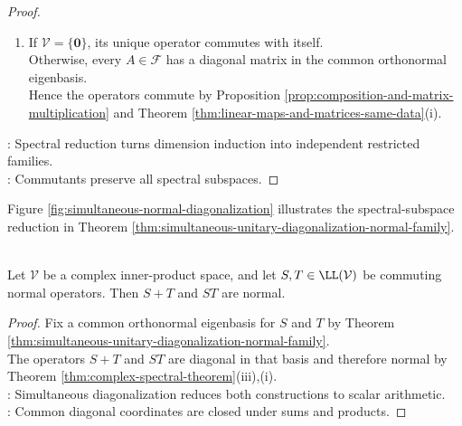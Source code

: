 \begin{theorem}
\begin{proof}
\begin{enumerate}[label=\roman*.]
The identity $\mathcal{V}=\bigoplus\limits_{j=1}^{d}{}^{\perp}\operatorname{range}(P_j)$ holds by Theorem \ref{thm:spectral-resolution-normal-operator}(i)--(ii).\\
Concatenating the restricted bases produces a common orthonormal eigenbasis of $\mathcal{V}$.
\item[$(\Leftarrow)$] If $\mathcal{V}=\{\mathbf{0}\}$, its unique operator commutes with itself.\\
Otherwise, every $A\in\mathcal{F}$ has a diagonal matrix in the common orthonormal eigenbasis.\\
Hence the operators commute by Proposition \ref{prop:composition-and-matrix-multiplication} and Theorem \ref{thm:linear-maps-and-matrices-same-data}(i).
\end{enumerate}
: Spectral reduction turns dimension induction into independent restricted families.\\
: Commutants preserve all spectral subspaces.
\end{proof}
\end{theorem}

Figure \ref{fig:simultaneous-normal-diagonalization} illustrates the spectral-subspace reduction in Theorem \ref{thm:simultaneous-unitary-diagonalization-normal-family}.

\begin{illustrationfigure}[H]
  \centering
  
  \caption{The spectral ranges of $A_0=\sum\limits_j\mu_jP_j$ reduce the commuting family for dimension induction.}
  \label{fig:simultaneous-normal-diagonalization}
\end{illustrationfigure}

\begin{corollary} \label{cor:commuting-normal-sums-products-normal} \\
Let $\mathcal{V}$ be a complex inner-product space, and let $S,T\in\LL(\mathcal{V})$ be commuting normal operators. Then $S+T$ and $ST$ are normal.
\begin{proof}
Fix a common orthonormal eigenbasis for $S$ and $T$ by Theorem \ref{thm:simultaneous-unitary-diagonalization-normal-family}.\\
The operators $S+T$ and $ST$ are diagonal in that basis and therefore normal by Theorem \ref{thm:complex-spectral-theorem}(iii),(i).\\
: Simultaneous diagonalization reduces both constructions to scalar arithmetic.\\
: Common diagonal coordinates are closed under sums and products.
\end{proof}
\end{corollary}

